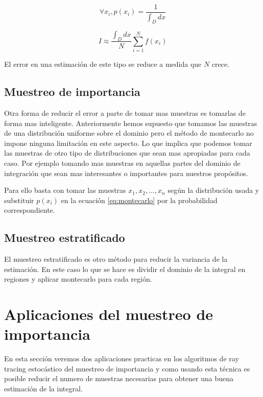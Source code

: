 \begin{equation}
\forall x_i, p(x_i) = \frac{1}{\int _D dx}
\end{equation}

\begin{equation}
I \approx \frac{\int _D dx}{N} \sum_{i=1} ^N f(x_i)
\end{equation}

El error en una estimación de este tipo se reduce a medida que $N$ crece.
\clearpage

\subsection{Muestreo de importancia}
    
Otra forma de reducir el error a parte de tomar mas muestras es tomarlas de forma mas inteligente. Anteriormente hemos supuesto que tomamos las muestras de una distribución uniforme sobre el dominio pero el método de montecarlo no impone ninguna limitación en este aspecto. Lo que implica que podemos tomar las muestras de otro tipo de distribuciones que sean mas apropiadas para cada caso. Por ejemplo tomando mas muestras en aquellas partes del dominio de integración que sean mas interesantes o importantes para nuestros propósitos.

\medskip

Para ello basta con tomar las muestras $x_1, x_2, ..., x_n$ según la distribución usada y substituir $p(x_i)$ en la ecuación \ref{eq:montecarlo} por la probabilidad correspondiente.

\subsection{Muestreo estratificado}

El muestreo estratificado es otro método para reducir la variancia de la estimación. En este caso lo que se hace es dividir el dominio de la integral en regiones y aplicar montecarlo para cada región. 

\clearpage

\section{Aplicaciones del muestreo de importancia}

En esta sección veremos dos aplicaciones practicas en los algoritmos de ray tracing estocástico del muestreo de importancia y como usando esta técnica es posible reducir el numero de muestras necesarias para obtener una buena estimación de la integral.


